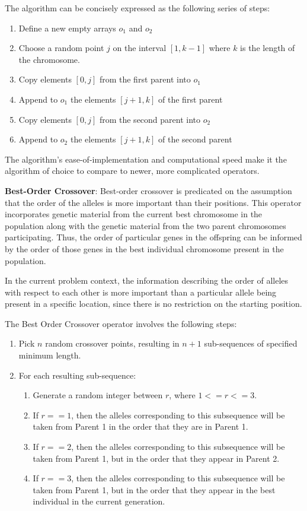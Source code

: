 \documentclass[12pt,twocolumn,oneside]{osajnl}
\begin{document}
The algorithm can be concisely expressed as the following series of steps:
\begin{enumerate}
    \item Define a new empty arrays $o_1$ and $o_2$
    \item Choose a random point $j$ on the interval $[1, k-1]$ where $k$ is the length of the chromosome.
    \item Copy elements $[0, j]$ from the first parent into $o_1$
    \item Append to $o_1$ the elements $[j+1, k]$ of the first parent
    \item Copy elements $[0, j]$ from the second parent into $o_2$
    \item Append to $o_2$ the elements $[j+1, k]$ of the second parent
\end{enumerate}

The algorithm's ease-of-implementation and computational speed make it the algorithm of choice to compare to newer, more complicated operators.

\textbf{Best-Order Crossover}: Best-order crossover is predicated on the assumption that the order of the alleles is more important than their positions. This operator incorporates genetic material from the current best chromosome in the population along with the genetic material from the two parent chromosomes participating. Thus, the order of particular genes in the offspring can be informed by the order of those genes in the best individual chromosome present in the population\cite{andreica2015best}.

In the current problem context, the information describing the order of alleles with respect to each other is more important than a particular allele being present in a specific location, since there is no restriction on the starting position.

The Best Order Crossover operator involves the following steps:
\begin{enumerate}
    \item Pick $n$ random crossover points, resulting in $n+1$ sub-sequences of specified minimum length.
    \item For each resulting sub-sequence:
    \begin{enumerate}
        \item Generate a random integer between $r$, where $1 <= r <= 3$.
        \item If $r == 1$, then the alleles corresponding to this subsequence will be taken from Parent 1 in the order that they are in Parent 1.
        \item If $r == 2$, then the alleles corresponding to this subsequence will be taken from Parent 1, but in the order that they appear in Parent 2.
        \item If $r == 3$, then the alleles corresponding to this subsequence will be taken from Parent 1, but in the order that they appear in the best individual in the current generation.
    \end{enumerate}
\end{enumerate}
\end{document}
